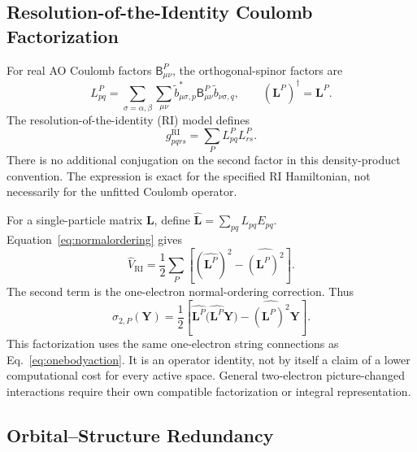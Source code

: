 \documentclass[12pt]{article}
\begin{document}
\subsection{Resolution-of-the-Identity Coulomb Factorization}

For real AO Coulomb factors \(\mathsf B^P_{\mu\nu}\), the orthogonal-spinor factors are
\begin{equation}
 L^P_{pq}=\sum_{\sigma=\alpha,\beta}\sum_{\mu\nu}
 \widetilde b_{\mu\sigma,p}^*\mathsf B^P_{\mu\nu}
 \widetilde b_{\nu\sigma,q},
 \qquad (\mathbf L^P)^\dagger=\mathbf L^P.
 \label{eq:rifactors}
\end{equation}
The resolution-of-the-identity (RI) model defines
\begin{equation}
 g^{\mathrm{RI}}_{pqrs}=\sum_P L^P_{pq}L^P_{rs}.
 \label{eq:riintegrals}
\end{equation}
There is no additional conjugation on the second factor in this density-product convention. The expression is exact for the specified RI Hamiltonian, not necessarily for the unfitted Coulomb operator.

For a single-particle matrix \(\mathbf L\), define
\(\widehat{\mathbf L}=\sum_{pq}L_{pq}E_{pq}\). Equation~\eqref{eq:normalordering} gives
\begin{equation}
 \boxed{\hat V_{\mathrm{RI}}=
 \frac12\sum_P\left[
 (\widehat{\mathbf L^P})^2-\widehat{(\mathbf L^P)^2}
 \right].}
 \label{eq:rioperator}
\end{equation}
The second term is the one-electron normal-ordering correction. Thus
\begin{equation}
 \sigma_{2,P}(\mathbf Y)=\frac12\left[
 \widehat{\mathbf L^P}\big(\widehat{\mathbf L^P}\mathbf Y\big)
 -\widehat{(\mathbf L^P)^2}\mathbf Y\right].
 \label{eq:riaction}
\end{equation}
This factorization uses the same one-electron string connections as Eq.~\eqref{eq:onebodyaction}. It is an operator identity, not by itself a claim of a lower computational cost for every active space. General two-electron picture-changed interactions require their own compatible factorization or integral representation.

\subsection{Orbital--Structure Redundancy}
\end{document}
